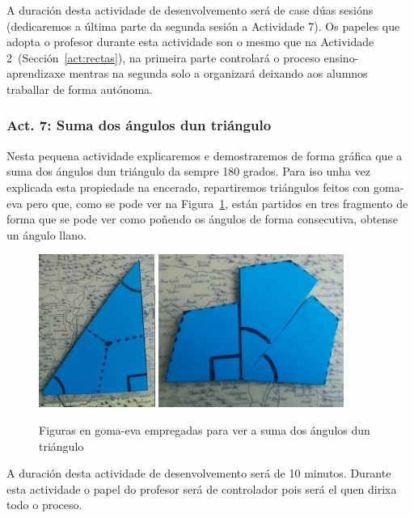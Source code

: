 A duración desta actividade de desenvolvemento será de case dúas sesións (dedicaremos a última parte da segunda sesión a Actividade 7). Os papeles que adopta o profesor durante esta actividade son o mesmo que na Actividade 2~(Sección~\ref{act:rectas}), na primeira parte controlará o proceso ensino-aprendizaxe mentras na segunda solo a organizará deixando aos alumnos traballar de forma autónoma.

\subsubsection{Act. 7: Suma dos ángulos dun triángulo}\label{act:sumangulos}
Nesta pequena actividade explicaremos e demostraremos de forma gráfica que a suma dos ángulos dun triángulo da sempre 180 grados. Para iso unha vez explicada esta propiedade na encerado, repartiremos triángulos feitos con goma-eva pero que, como se pode ver na Figura~\ref{fig:act11}, están partidos en tres fragmento de forma que se pode ver como poñendo os ángulos de forma consecutiva, obtense un ángulo llano.

\begin{figure}[h!]
  \centering
  \includegraphics[height=5cm]{img/180grados-2.png}
  \includegraphics[height=5cm]{img/180grados-1.png}
  \caption{Figuras en goma-eva empregadas para ver a suma dos ángulos dun triángulo}\label{fig:act11}
\end{figure}

A duración desta actividade de desenvolvemento será de 10 minutos. Durante esta actividade o papel do profesor será de controlador pois será el quen dirixa todo o proceso.

